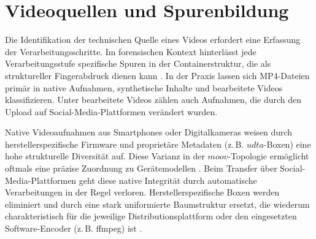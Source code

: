 \section{Videoquellen und Spurenbildung}
\label{sec:videoquellen}

Die Identifikation der technischen Quelle eines Videos erfordert eine Erfassung der Verarbeitungsschritte. Im forensischen Kontext hinterlässt jede Verarbeitungsstufe spezifische Spuren in der Containerstruktur, die als struktureller Fingerabdruck dienen kann \cite[S. s68]{gloe_forensic_2014}. In der Praxis lassen sich MP4-Dateien primär in native Aufnahmen, synthetische Inhalte und bearbeitete Videos klassifizieren. Unter bearbeitete Videos zählen auch Aufnahmen, die durch den Upload auf Social-Media-Plattformen verändert wurden.

Native Videoaufnahmen aus Smartphones oder Digitalkameras weisen durch herstellerspezifische Firmware und proprietäre Metadaten (z.\,B. \(udta\)-Boxen) eine hohe strukturelle Diversität auf. Diese Varianz in der \(moov\)-Topologie ermöglicht oftmals eine präzise Zuordnung zu Gerätemodellen \cite{shullani_vision_2017, iuliani_video_2019}. Beim Transfer über Social-Media-Plattformen geht diese native Integrität durch automatische Verarbeitungen in der Regel verloren. Herstellerspezifische Boxen werden eliminiert und durch eine stark uniformierte Baumstruktur ersetzt, die wiederum charakteristisch für die jeweilige Distributionsplattform oder den eingesetzten Software-Encoder (z.\,B. ffmpeg) ist \cite[S. 947]{yang_efficient_2020}.

